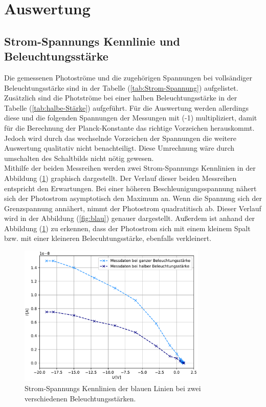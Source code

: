 \nocite{anleitungV500}
\section{Auswertung}
\label{sec:Auswertung}

\subsection{Strom-Spannungs Kennlinie und Beleuchtungsstärke}
Die gemessenen Photoströme und die zugehörigen Spannungen bei vollsändiger Beleuchtungsstärke sind in der Tabelle (\ref{tab:Strom-Spannung}) aufgelistet. 
Zusätzlich sind die Photströme bei einer halben Beleuchtungsstärke in der Tabelle (\ref{tab:halbe-Stärke}) aufgeführt.
Für die Auswertung werden allerdings diese und die folgenden Spannungen der Messungen mit (-1) multipliziert, damit für die Berechnung der Planck-Konstante 
das richtige Vorzeichen herauskommt. Jedoch wird durch das wechselnde Vorzeichen der Spannungen die weitere Auswertung qualitativ nicht benachteiligt. Diese
Umrechnung wäre durch umschalten des Schaltbilds nicht nötig gewesen. \\
Mithilfe der beiden Messreihen werden zwei Strom-Spannungs Kennlinien in der Abbildung (\ref{fig:Plot1}) graphisch dargestellt. Der Verlauf dieser beiden
Messreihen entspricht den Erwartungen. Bei einer höheren Beschleunigungsspannung nähert sich der Photostrom asymptotisch den Maximum an. Wenn die Spannung sich
der Grenzspannung annähert, nimmt der Photostrom quadratitisch ab. Dieser Verlauf wird in der Abbildung (\ref{fig:blau}) genauer dargestellt. Außerdem ist anhand der Abbildung (\ref{fig:Plot1})
zu erkennen, dass der Photostrom sich mit einem kleinem Spalt bzw. mit einer kleineren Belecuhtungsstärke, ebenfalls verkleinert. 
\begin{figure}[H]
    \centering
    \includegraphics[width=0.8\textwidth]{Plots/Plot1.pdf}
    \caption{Strom-Spannungs Kennlinien der blauen Linien bei zwei verschiedenen Beleuchtungsstärken.}
    \label{fig:Plot1}
\end{figure}
